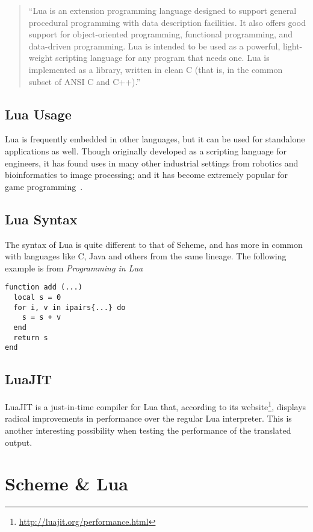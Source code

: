 \begin{quotation}
``Lua is an extension programming language designed to support general
procedural programming with data description facilities. It also offers good
support for object-oriented programming, functional programming, and data-driven
programming. Lua is intended to be used as a powerful, light-weight scripting
language for any program that needs one. Lua is implemented as a library,
written in clean C (that is, in the common subset of ANSI C and
C++).''~\cite[Sec~1]{luamanual}
\end{quotation}
\subsection{Lua Usage}

Lua is frequently embedded in other languages, but it can be used for standalone
applications as well. Though originally developed as a scripting language for
engineers, it has found uses in many other industrial settings from robotics and
bioinformatics to image processing; and it has become extremely popular for game
programming~\cite{evolua}.

\subsection{Lua Syntax}

The syntax of Lua is quite different to that of Scheme, and has more in common
with languages like C, Java and others from the same lineage. The following example is from \emph{Programming in Lua}~\cite[p.40]{luabook}
\begin{framed}
\begin{verbatim}
function add (...)
  local s = 0
  for i, v in ipairs{...} do
    s = s + v
  end
  return s
end
\end{verbatim}
\end{framed}

\subsection{LuaJIT}

LuaJIT\cite{luajit} is a just-in-time compiler for Lua that, according to its
website\footnote{\url{http://luajit.org/performance.html}}, displays radical
improvements in performance over the regular Lua interpreter. This is another
interesting possibility when testing the performance of the translated output.


\section{Scheme \& Lua}

